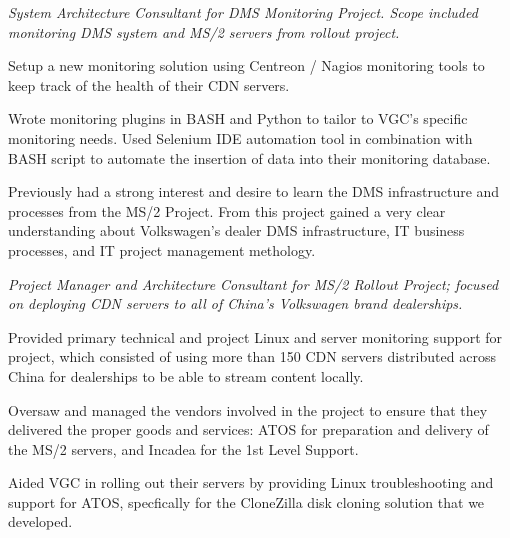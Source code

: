 \documentclass[a4paper]{deedy-resume-proximanova-sanfran} %
\begin{document}
\begin{minipage}[t]{0.66\textwidth}
\emph{System Architecture Consultant for DMS Monitoring Project. Scope included monitoring DMS system and MS/2 servers from rollout project.}
\begin{tightitemize}
\item Setup a new monitoring solution using Centreon / Nagios monitoring tools to keep track of the health of their CDN servers.
\item Wrote monitoring plugins in BASH and Python to tailor to VGC's specific monitoring needs. Used Selenium IDE automation tool in combination with BASH script to automate the insertion of data into their monitoring database.
\item Previously had a strong interest and desire to learn the DMS infrastructure and processes from the MS/2 Project. From this project gained a very clear understanding about Volkswagen's dealer DMS infrastructure, IT business processes, and IT project management methology. 
\end{tightitemize}

\sectionspace %

\emph{Project Manager and Architecture Consultant for MS/2 Rollout Project; focused on deploying CDN servers to all of China's Volkswagen brand dealerships.}
\begin{tightitemize}
\item Provided primary technical and project Linux and server monitoring support for project, which consisted of using more than 150 CDN servers distributed across China for dealerships to be able to stream content locally.
\item Oversaw and managed the vendors involved in the project to ensure that they delivered the proper goods and services: ATOS for preparation and delivery of the MS/2 servers, and Incadea for the 1st Level Support.
\item Aided VGC in rolling out their servers by providing Linux troubleshooting and support for ATOS, specfically for the CloneZilla disk cloning solution that we developed.
\end{tightitemize}


\end{minipage}
\end{document}
